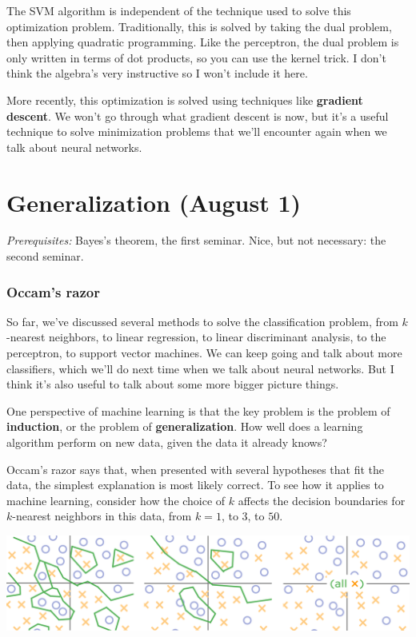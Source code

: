 \documentclass[11pt,paper=letter]{scrartcl}
\begin{document}
The SVM algorithm is independent of the technique used to solve this optimization problem. Traditionally, this is solved by taking the dual problem, then applying quadratic programming. Like the perceptron, the dual problem is only written in terms of dot products, so you can use the kernel trick. I don't think the algebra's very instructive so I won't include it here.

More recently, this optimization is solved using techniques like \textbf{gradient descent}. We won't go through what gradient descent is now, but it's a useful technique to solve minimization problems that we'll encounter again when we talk about neural networks.

\clearpage

\section{Generalization (August 1)}

\textit{Prerequisites:} Bayes's theorem, the first seminar. Nice, but not necessary: the second seminar.

\subsubsection*{Occam's razor}

So far, we've discussed several methods to solve the classification problem, from $k$-nearest neighbors, to linear regression, to linear discriminant analysis, to the perceptron, to support vector machines. We can keep going and talk about more classifiers, which we'll do next time when we talk about neural networks. But I think it's also useful to talk about some more bigger picture things.

One perspective of machine learning is that the key problem is the problem of \textbf{induction}, or the problem of \textbf{generalization}. How well does a learning algorithm perform on new data, given the data it already knows?

Occam's razor says that, when presented with several hypotheses that fit the data, the simplest explanation is most likely correct. To see how it applies to machine learning, consider how the choice of $k$ affects the decision boundaries for $k$-nearest neighbors in this data, from $k = 1$, to $3$, to $50$.

\begin{center}
  \includegraphics[width=\textwidth]{16.png}
\end{center}
\end{document}
